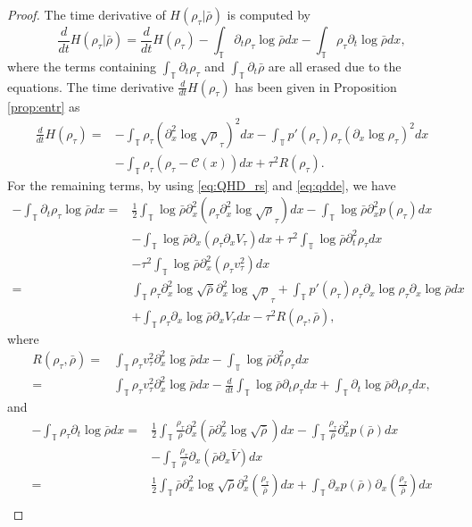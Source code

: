 \documentclass[leqno]{amsart}
\theoremstyle{plain}
\theoremstyle{definition}
\theoremstyle{remark}
\theoremstyle{plain}
\theoremstyle{plain}
\def\T{{\mathbb T}}%
\def\d{{\partial}}
\numberwithin{equation}{section}
\begin{document}
\begin{proof}
The time derivative of $H(\rho_\tau|\bar\rho)$ is computed by
\[
\frac{d}{dt}H(\rho_\tau|\bar\rho)=\frac{d}{dt}H(\rho_\tau)-\int_\T \d_t\rho_\tau\log\bar\rho dx-\int_\T \rho_\tau\d_t\log\bar\rho dx,
\]
where the terms containing $\int_\T\d_t\rho_\tau$ and $\int_\T\d_t\bar\rho$ are all erased due to the equations. The time derivative $\frac{d}{dt}H(\rho_\tau)$ has been given in Proposition \ref{prop:entr} as
\begin{align*}
\frac{d}{dt}H(\rho_\tau)=&-\int_\T\rho_\tau(\d_x^2\log\sqrt\rho_\tau)^2 dx-\int_\T p'(\rho_\tau)\rho_\tau(\d_x\log\rho_\tau)^2dx\\
&-\int_\T\rho_\tau(\rho_\tau-\mathcal{C}(x))dx+\tau^2 R(\rho_\tau).
\end{align*}
For the remaining terms, by using \eqref{eq:QHD_rs} and \eqref{eq:qdde}, we have
\begin{align*}
-\int_\T \d_t\rho_\tau\log\bar\rho dx=&\frac12\int_\T\log\bar\rho\d_x^2(\rho_\tau\d_x^2\log\sqrt\rho_\tau)dx-\int_\T\log\bar\rho\d_x^2p(\rho_\tau)dx\\
&-\int_\T\log\bar\rho\d_x(\rho_\tau\d_xV_\tau) dx+\tau^2\int_\T\log\bar\rho\d_t^2\rho_\tau dx\\
&-\tau^2\int_\T\log\bar\rho\d_x^2(\rho_\tau v_\tau^2)dx\\
=&\int_\T\rho_\tau\d_x^2\log\sqrt{\bar\rho}\d_x^2\log\sqrt\rho_\tau+\int_\T p'(\rho_\tau)\rho_\tau\d_x\log\rho_\tau\d_x\log\bar\rho dx\\
&+\int_\T\rho_\tau\d_x\log\bar\rho\d_xV_\tau dx-\tau^2 R(\rho_\tau,\bar\rho),
\end{align*}
where 
\begin{align*}
R(\rho_\tau,\bar\rho)=&\int_\T\rho_\tau v_\tau^2\d_x^2\log\bar\rho dx-\int_\T\log\bar\rho\d_t^2\rho_\tau dx\\
=&\int_\T\rho_\tau v_\tau^2\d_x^2\log\bar\rho dx-\frac{d}{dt}\int_\T\log\bar\rho\d_t\rho_\tau dx+\int_\T\d_t\log\bar\rho\d_t\rho_\tau dx,
\end{align*}
and
\begin{align*}
-\int_\T \rho_\tau\d_t\log\bar\rho dx=&\frac12\int_\T \frac{\rho_\tau}{\bar\rho}\d_x^2(\bar\rho\d_x^2\log\sqrt{\bar\rho})dx-\int_\T \frac{\rho_\tau}{\bar\rho}\d_x^2p(\bar\rho)dx\\
&-\int_\T \frac{\rho_\tau}{\bar\rho}\d_x(\bar\rho\d_x\bar V)dx\\
=&\frac12\int_\T \bar\rho\d_x^2\log\sqrt{\bar\rho}\d_x^2\left(\frac{\rho_\tau}{\bar\rho}\right)dx+\int_\T \d_xp(\bar\rho)\d_x\left(\frac{\rho_\tau}{\bar\rho}\right)dx\\

\end{align*}
\end{proof}
\end{document}
